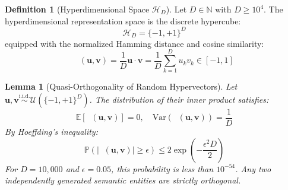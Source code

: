 \documentclass[12pt,oneside,a4paper]{book}
\theoremstyle{definition}
\newtheorem{definition}{Definition}[chapter]
\theoremstyle{plain}
\newtheorem{lemma}{Lemma}[chapter]
\theoremstyle{remark}
\DeclareMathOperator{\simcos}{sim_{\cos}}
\begin{document}
\begin{definition}[Hyperdimensional Space $\mathcal{H}_D$]
Let $D \in \mathbb{N}$ with $D \ge 10^4$. The hyperdimensional representation space is the discrete hypercube:
\begin{equation}
    \mathcal{H}_D = \{-1, +1\}^D
\end{equation}
equipped with the normalized Hamming distance and cosine similarity:
\begin{equation}
    \simcos(\mathbf{u}, \mathbf{v}) = \frac{1}{D} \mathbf{u} \cdot \mathbf{v} = \frac{1}{D} \sum_{k=1}^D u_k v_k \in [-1, 1]
\end{equation}
\end{definition}

\begin{lemma}[Quasi-Orthogonality of Random Hypervectors]
Let $\mathbf{u}, \mathbf{v} \stackrel{\text{i.i.d.}}{\sim} \mathcal{U}(\{-1, +1\}^D)$. The distribution of their inner product satisfies:
\begin{equation}
    \mathbb{E}[\simcos(\mathbf{u}, \mathbf{v})] = 0, \quad \mathrm{Var}(\simcos(\mathbf{u}, \mathbf{v})) = \frac{1}{D}
\end{equation}
By Hoeffding's inequality:
\begin{equation}
    \mathbb{P}\left(|\simcos(\mathbf{u}, \mathbf{v})| \ge \epsilon\right) \le 2 \exp\left( - \frac{\epsilon^2 D}{2} \right)
\end{equation}
For $D = 10,000$ and $\epsilon = 0.05$, this probability is less than $10^{-54}$. Any two independently generated semantic entities are strictly orthogonal.
\end{lemma}
\end{document}
